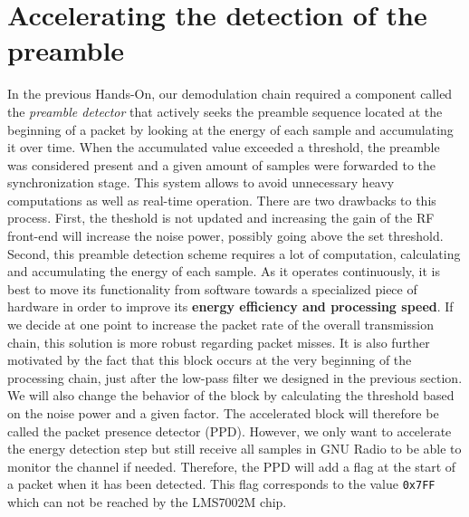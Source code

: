 \section{Accelerating the detection of the preamble}
In the previous Hands-On, our demodulation chain required a component called the \textit{preamble detector} that actively seeks the preamble sequence located at the beginning of a packet by looking at the energy of each sample and accumulating it over time. When the accumulated value exceeded a threshold, the preamble was considered present and a given amount of samples were forwarded to the synchronization stage. This system allows to avoid unnecessary heavy computations as well as real-time operation. There are two drawbacks to this process. First, the theshold is not updated and increasing the gain of the RF front-end will increase the noise power, possibly going above the set threshold. Second, this preamble detection scheme requires a lot of computation, calculating and accumulating the energy of each sample. As it operates continuously, it is best to move its functionality from software towards a specialized piece of hardware in order to improve its \textbf{energy efficiency and processing speed}. If we decide at one point to increase the packet rate of the overall transmission chain, this solution is more robust regarding packet misses. It is also further motivated by the fact that this block occurs at the very beginning of the processing chain, just after the low-pass filter we designed in the previous section. We will also change the behavior of the block by calculating the threshold based on the noise power and a given factor. The accelerated block will therefore be called the packet presence detector (PPD). However, we only want to accelerate the energy detection step but still receive all samples in GNU Radio to be able to monitor the channel if needed. Therefore, the PPD will add a flag at the start of a packet when it has been detected. This flag corresponds to the value \texttt{0x7FF} which can not be reached by the LMS7002M chip.


